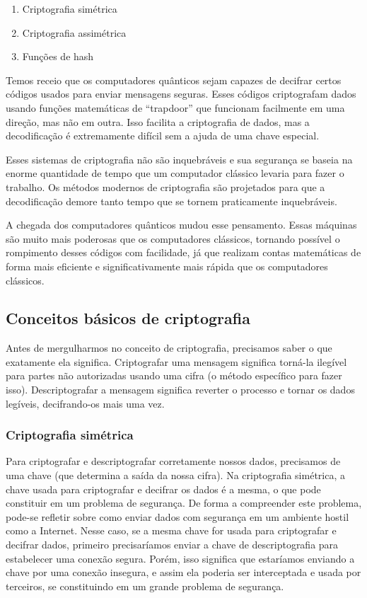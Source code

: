 \begin{enumerate}
  \item Criptografia simétrica
  \item Criptografia assimétrica
  \item Funções de hash
\end{enumerate}

Temos receio que os computadores quânticos sejam capazes de decifrar certos códigos usados para enviar mensagens seguras. Esses códigos criptografam dados usando funções matemáticas de ``trapdoor'' que funcionam facilmente em uma direção, mas não em outra. Isso facilita a criptografia de dados, mas a decodificação é extremamente difícil sem a ajuda de uma chave especial.

Esses sistemas de criptografia não são inquebráveis e sua segurança se baseia na enorme quantidade de tempo que um computador clássico levaria para fazer o trabalho. Os métodos modernos de criptografia são projetados para que a decodificação demore tanto tempo que se tornem praticamente inquebráveis.

A chegada dos computadores quânticos mudou esse pensamento. Essas máquinas são muito mais poderosas que os computadores clássicos, tornando possível o rompimento desses códigos com facilidade, já que realizam contas matemáticas de forma mais eficiente e significativamente mais rápida que os computadores clássicos.

\subsection{Conceitos básicos de criptografia}
Antes de mergulharmos no conceito de criptografia, precisamos saber o que exatamente ela significa. Criptografar uma mensagem significa torná-la ilegível para partes não autorizadas usando uma cifra (o método específico para fazer isso). Descriptografar a mensagem significa reverter o processo e tornar os dados legíveis, decifrando-os mais uma vez.

\subsubsection{Criptografia simétrica}
Para criptografar e descriptografar corretamente nossos dados, precisamos de uma chave (que determina a saída da nossa cifra).  Na criptografia simétrica,  a chave usada para criptografar e decifrar os dados é a mesma, o que pode constituir em um problema de segurança. De forma a compreender este problema, pode-se refletir sobre como enviar dados com segurança em um ambiente hostil como a Internet. Nesse caso, se a mesma chave for usada para criptografar e decifrar dados, primeiro precisaríamos  enviar  a  chave  de  descriptografia  para  estabelecer  uma  conexão segura.  Porém, isso significa que estaríamos enviando a chave por uma conexão insegura, e assim ela poderia ser interceptada e usada por terceiros, se constituindo em um grande problema de segurança. 


